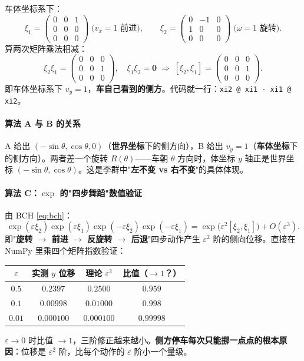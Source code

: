 \documentclass[11pt,a4paper]{article}
\theoremstyle{mythm}
\theoremstyle{mydef}
\begin{document}
车体坐标系下：
$$\xi_1 = \begin{pmatrix}0 & 0 & 1\\ 0 & 0 & 0\\ 0 & 0 & 0\end{pmatrix}\;\text{($v_x = 1$ 前进)},\qquad \xi_2 = \begin{pmatrix}0 & -1 & 0\\ 1 & 0 & 0\\ 0 & 0 & 0\end{pmatrix}\;\text{($\omega = 1$ 旋转)}.$$
算两次矩阵乘法相减：
$$\xi_2\xi_1 = \begin{pmatrix}0 & 0 & 0\\ 0 & 0 & 1\\ 0 & 0 & 0\end{pmatrix},\quad \xi_1\xi_2 = \mathbf{0}\;\Longrightarrow\;[\xi_2, \xi_1] = \begin{pmatrix}0 & 0 & 0\\ 0 & 0 & 1\\ 0 & 0 & 0\end{pmatrix}.$$
即车体坐标系下 $v_y = 1$，\textbf{车自己看到的侧方}。代码就一行：\verb|xi2 @ xi1 - xi1 @ xi2|。

\paragraph{算法 A 与 B 的关系}
A 给出 $(-\sin\theta, \cos\theta, 0)$（\textbf{世界坐标}下的侧方向），B 给出 $v_y = 1$（\textbf{车体坐标}下的侧方向）。两者差一个旋转 $R(\theta)$——车朝 $\theta$ 方向时，体坐标 $y$ 轴正是世界坐标 $(-\sin\theta, \cos\theta)$。这是李群中"\textbf{左不变 vs 右不变}"的具体体现。

\paragraph{算法 C：$\exp$ 的"四步舞蹈"数值验证}

由 BCH \eqref{eq:bch}：
$$\exp(\varepsilon\xi_2)\exp(\varepsilon\xi_1)\exp(-\varepsilon\xi_2)\exp(-\varepsilon\xi_1) = \exp\!\big(\varepsilon^2[\xi_2,\xi_1]\big) + O(\varepsilon^3).$$
即"\textbf{旋转 $\to$ 前进 $\to$ 反旋转 $\to$ 后退}"四步动作产生 $\varepsilon^2$ 阶的侧向位移。直接在 NumPy 里乘四个矩阵指数验证：

\begin{center}
\begin{tabular}{c|cc|c}
\hline
$\varepsilon$ & 实测 $y$ 位移 & 理论 $\varepsilon^2$ & 比值（$\to 1$？）\\\hline
$0.5$  & $0.2397$    & $0.2500$   & $0.959$ \\
$0.1$  & $0.00998$   & $0.01000$  & $0.998$ \\
$0.01$ & $0.000100$  & $0.000100$ & $0.99998$ \\\hline
\end{tabular}
\end{center}
$\varepsilon \to 0$ 时比值 $\to 1$，三阶修正越来越小。\textbf{侧方停车每次只能挪一点点的根本原因}：位移是 $\varepsilon^2$ 阶，比每个动作的 $\varepsilon$ 阶小一个量级。
\end{document}
